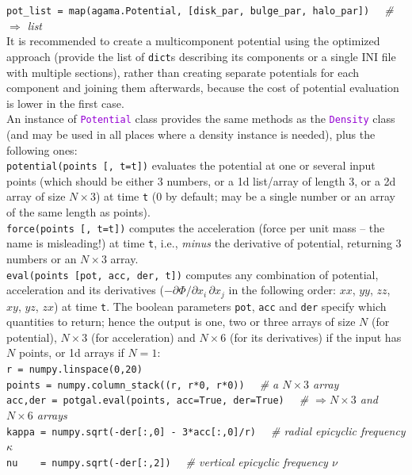 \documentclass[12pt]{article}
\newcommand{\ttt}[1]{\textcolor{darkviolet}{\texttt{#1}}}
\begin{document}
\texttt{pot_list = map(agama.Potential, [disk_par, bulge_par, halo_par])}\textit{\color{Sepia} \ \ \# $\Rightarrow$ list}\\
It is recommended to create a multicomponent potential using the optimized approach (provide the list of \texttt{dict}s describing its components or a single INI file with multiple sections), rather than creating separate potentials for each component and joining them afterwards, because the cost of potential evaluation is lower in the first case.\\[2mm]
An instance of \ttt{Potential} class provides the same methods as the \ttt{Density} class (and may be used in all places where a density instance is needed), plus the following ones:\\[2mm]
\texttt{potential(points [, t=t])} evaluates the potential at one or several input points (which should be either 3 numbers, or a 1d list/array of length 3, or a 2d array of size $N\times3$) at time \texttt{t} (0 by default; may be a single number or an array of the same length as points).\\[2mm]
\texttt{force(points [, t=t])} computes the acceleration (force per unit mass -- the name is misleading!) at time \texttt{t}, i.e., \textit{minus} the derivative of potential, returning 3 numbers or an $N\times3$ array.\\[2mm]
\texttt{eval(points [pot, acc, der, t])} computes any combination of potential, acceleration and its derivatives ($-\partial \Phi / \partial x_i\,\partial x_j$ in the following order: $xx$, $yy$, $zz$, $xy$, $yz$, $zx$) at time \texttt{t}. The boolean parameters \texttt{pot}, \texttt{acc} and \texttt{der} specify which quantities to return; hence the output is one, two or three arrays of size $N$ (for potential), $N\times3$ (for acceleration) and $N\times6$ (for its derivatives) if the input has $N$ points, or 1d arrays if $N=1$:\\[1mm]
\texttt{r = numpy.linspace(0,20)}\\
\texttt{points = numpy.column_stack((r, r*0, r*0))}
\textit{\color{Sepia} \ \ \# a $N\times3$ array}\\
\texttt{acc,der = potgal.eval(points, acc=True, der=True)}
\textit{\color{Sepia} \ \ \# $\Rightarrow N\times3$ and $N\times6$ arrays} \\
\texttt{kappa = numpy.sqrt(-der[:,0] - 3*acc[:,0]/r)}
\textit{\color{Sepia} \ \ \# radial epicyclic frequency $\kappa$} \\
\texttt{nu~~~~= numpy.sqrt(-der[:,2])}
\textit{\color{Sepia} \ \ \# vertical epicyclic frequency $\nu$} \\[1mm]
\end{document}
